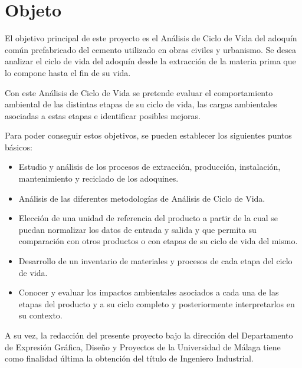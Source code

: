 \chapter{Objeto}\label{cap:objeto}
El objetivo principal de este proyecto es el Análisis de Ciclo de Vida del adoquín común prefabricado del cemento utilizado en obras civiles y urbanismo. Se desea analizar el ciclo de vida del adoquín desde la extracción de la materia prima que lo compone hasta el fin de su vida.

Con este Análisis de Ciclo de Vida se pretende evaluar el comportamiento ambiental de las distintas etapas de su ciclo de vida, las cargas ambientales asociadas a estas etapas e identificar posibles mejoras.

Para poder conseguir estos objetivos, se pueden establecer los siguientes puntos básicos:
\begin{itemize}
\item Estudio y análisis de los procesos de extracción, producción, instalación, mantenimiento y reciclado de los adoquines.
\item Análisis de las diferentes metodologías de Análisis de Ciclo de Vida.
\item Elección de una unidad de referencia del producto a partir de la cual se puedan normalizar los datos de entrada y salida y que permita su comparación con otros productos o con etapas de su ciclo de vida del mismo.
\item Desarrollo de un inventario de materiales y procesos de cada etapa del ciclo de vida.
\item Conocer y evaluar los impactos ambientales asociados a cada una de las etapas del producto y a su ciclo completo y posteriormente interpretarlos en su contexto.
\end{itemize}

A su vez, la redacción del presente proyecto bajo la dirección del Departamento de Expresión Gráfica, Diseño y Proyectos de la Universidad de Málaga tiene como finalidad última la obtención del título de Ingeniero Industrial.
